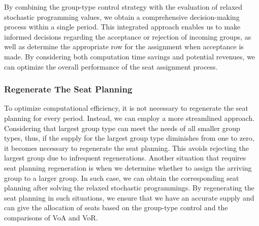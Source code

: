 

By combining the group-type control strategy with the evaluation of relaxed stochastic programming values, we obtain a comprehensive decision-making process within a single period. This integrated approach enables us to make informed decisions regarding the acceptance or rejection of incoming groups, as well as determine the appropriate row for the assignment when acceptance is made. By considering both computation time savings and potential revenues, we can optimize the overall performance of the seat assignment process.


\subsubsection{Regenerate The Seat Planning}

To optimize computational efficiency, it is not necessary to regenerate the seat planning for every period. Instead, we can employ a more streamlined approach. Considering that largest group type can meet the needs of all smaller group types, thus, if the supply for the largest group type diminishes from one to zero, it becomes necessary to regenerate the seat planning. This avoids rejecting the largest group due to infrequent regenerations. Another situation that requires seat planning regeneration is when we determine whether to assign the arriving group to a larger group. In such case, we can obtain the corresponding seat planning after solving the relaxed stochastic programmings. By regenerating the seat planning in such situations, we ensure that we have an accurate supply and can give the allocation of seats based on the group-type control and the comparisons of VoA and VoR.

